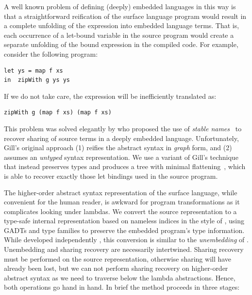 A well known problem of defining (deeply) embedded languages in this way is that
a straightforward reification of the surface language program would result in a
complete unfolding of the expression into embedded language terms. That is, each
occurrence of a let-bound variable in the source program would create a separate
unfolding of the bound expression in the compiled code. For example, consider
the following program:
%
\begin{lstlisting}[style=Haskell]
let ys = map f xs
in  zipWith g ys ys
\end{lstlisting}
%
If we do not take care, the expression will be inefficiently translated as:
%
\begin{lstlisting}[style=Haskell]
zipWith g (map f xs) (map f xs)
\end{lstlisting}

This problem was solved elegantly by \citet{Gill:2009dx} who proposed the use
of \emph{stable names}~\cite{PeytonJones:2000ks} to recover
sharing of source terms in a deeply embedded language. Unfortunately, Gill's
original approach (1) reifies the abstract syntax in \emph{graph} form, and (2)
assumes an \emph{untyped} syntax representation. We use a variant of Gill's
technique that instead preserves types and produces a tree with minimal
flattening~\cite{McDonell:2013wi}, which is able to recover exactly those let
bindings used in the source program.

The higher-order abstract syntax
representation of the surface language, while convenient for the human reader,
is awkward for program transformations as it complicates looking under lambdas.
We convert the source representation to a type-safe internal representation
based on nameless  indices in the style of
\citet{Altenkirch:2003kz}, using GADTs \cite{Jones:2006eh} and type families
\cite{Chakravarty:2005dx,Schrijvers:2008ir} to preserve the embedded program's
type information. While developed independently
\cite{McDonell:2013wi,Chakravarty:2009uo}, this conversion is similar to the
\emph{unembedding} of \citet{Atkey:2009dj}. Unembedding and sharing recovery are
necessarily intertwined. Sharing recovery must be performed on the source
representation, otherwise sharing will have already been lost, but we can not
perform sharing recovery on higher-order abstract syntax as we need to traverse below the lambda abstractions. Hence,
both operations go hand in hand. In brief the method proceeds in three stages:


